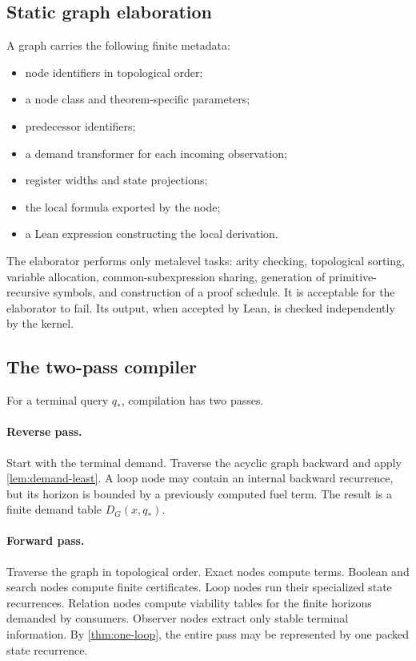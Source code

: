 \subsection{Static graph elaboration}

A \KIFC graph carries the following finite metadata:
\begin{itemize}
  \item node identifiers in topological order;
  \item a node class and theorem-specific parameters;
  \item predecessor identifiers;
  \item a demand transformer for each incoming observation;
  \item register widths and state projections;
  \item the local formula exported by the node;
  \item a Lean expression constructing the local derivation.
\end{itemize}
The elaborator performs only metalevel tasks: arity checking, topological sorting, variable allocation, common-subexpression sharing, generation of primitive-recursive symbols, and construction of a proof schedule.  It is acceptable for the elaborator to fail.  Its output, when accepted by Lean, is checked independently by the kernel.

\subsection{The two-pass compiler}

For a terminal query \(q_*\), compilation has two passes.

\paragraph{Reverse pass.}
Start with the terminal demand.  Traverse the acyclic graph backward and apply \cref{lem:demand-least}.  A loop node may contain an internal backward recurrence, but its horizon is bounded by a previously computed fuel term.  The result is a finite demand table \(D_G(x,q_*)\).

\paragraph{Forward pass.}
Traverse the graph in topological order.  Exact nodes compute terms.  Boolean and search nodes compute finite certificates.  Loop nodes run their specialized state recurrences.  Relation nodes compute viability tables for the finite horizons demanded by consumers.  Observer nodes extract only stable terminal information.  By \cref{thm:one-loop}, the entire pass may be represented by one packed state recurrence.

